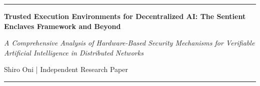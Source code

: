 \documentclass[12pt,a4paper]{article}
\newcommand{\papertitle}[1]{%
    {\LARGE\bfseries #1}%
}
\newcommand{\papersubtitle}[1]{%
    {\large\textit{#1}}%
}
\newcommand{\authorlist}[1]{%
    {\normalsize #1}%
}
\begin{document}
\thispagestyle{firstpage}

\noindent\rule{\textwidth}{0.4pt}

\vspace{1.5em}

\begin{center}
\papertitle{Trusted Execution Environments for Decentralized AI: The Sentient Enclaves Framework and Beyond}

\vspace{0.8em}

\papersubtitle{A Comprehensive Analysis of Hardware-Based Security Mechanisms for Verifiable Artificial Intelligence in Distributed Networks}

\vspace{1em}

\authorlist{Shiro Oni | Independent Research Paper}

\vspace{0.1em}

\end{center}

\noindent\rule{\textwidth}{0.4pt}

\vspace{0.5em}
\end{document}
